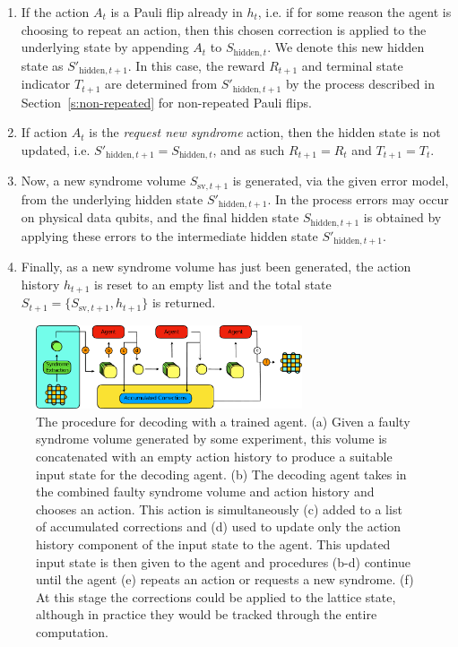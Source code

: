 \documentclass[twocolumn,preprintnumbers,amsmath,amssymb,notitlepage,nofootinbib,longbibliography,superscriptaddress,aps,pra,10pt]{revtex4-1}
\begin{document}
	\begin{enumerate}
		\item If the action $A_t$ is a Pauli flip already in $h_t$, i.e. if for some reason the agent is choosing to repeat an action, then this chosen correction is applied to the underlying state by appending $A_t$ to $S_{\mathrm{hidden},t}$.
		We denote this new hidden state as $S'_{\mathrm{hidden},t+1}$.
		In this case, the reward $R_{t+1}$ and terminal state indicator $T_{t+1}$ are determined from $S'_{\mathrm{hidden},t+1}$  by the process described in Section~\ref{s:non-repeated} for non-repeated Pauli flips.

		\item If action $A_t$ is the \emph{request new syndrome} action, then the hidden state is not updated, i.e. $S'_{\mathrm{hidden},t+1} = S_{\mathrm{hidden},t}$, and as such $R_{t+1} = R_{t}$ and $T_{t+1} = T_t$.

		\item Now, a new syndrome volume $S_{\mathrm{sv},t+1}$ is generated, via the given error model, from the underlying hidden state $S'_{\mathrm{hidden},t+1}$.
		In the process errors may occur on physical data qubits, and the final hidden state $S_{\mathrm{hidden},t+1}$ is obtained by applying these errors to the intermediate hidden state $S'_{\mathrm{hidden},t+1}$.

		\item Finally, as a new syndrome volume has just been generated, the action history $h_{t+1}$ is reset to an empty list and the total state $S_{t+1} = \{S_{\mathrm{sv},t+1},h_{t+1}\}$ is returned.
	\end{enumerate}

	\begin{figure}
		\centering
		\includegraphics[width=0.7\textwidth]{figures/agent_decoding.pdf}
		\caption{
			The procedure for decoding with a trained agent.
			(a) Given a faulty syndrome volume generated by some experiment, this volume is concatenated with an empty action history to produce a suitable input state for the decoding agent.
			(b) The decoding agent takes in the combined faulty syndrome volume and action history and chooses an action.
			This action is simultaneously (c) added to a list of accumulated corrections and (d) used to update only the action history component of the input state to the agent.
			This updated input state is then given to the agent and procedures (b-d) continue until the agent (e) repeats an action or requests a new syndrome.
			(f) At this stage the corrections could be applied to the lattice state, although in practice they would be tracked through the entire computation.
		}
		\label{agent_decoding}
	\end{figure}
\end{document}
